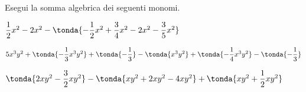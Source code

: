 % 

\begin{esercizio}
\label{ese:9.32}
Esegui la somma algebrica dei seguenti monomi.

\begin{enumeratea}
\spazielenx
\item 
\(\dfrac{1}{2}x^{2}-2x^{2}-\tonda{-{\dfrac{1}{2}}x^{2}+
\dfrac{3}{4}x^{2}-2x^{2}-\dfrac{3}{5}x^{2}}\)
\item 
\(5x^{3}y^{2}+\tonda{-{\dfrac{1}{3}}x^{3}y^{2}}+
\tonda{-{\dfrac{1}{3}}}-\tonda{x^{3}y^{2}}+
\tonda{-{\dfrac{1}{4}}x^{3}y^{2}}-\tonda{-{\dfrac{1}{3}}}\)
\item 
\(\tonda{2xy^{2}-\dfrac{3}{2}xy^{2}}-\tonda{xy^{2}+2xy^{2}-4xy^{2}
}+\tonda{xy^{2}+\dfrac{1}{2}xy^{2}}\)
\end{enumeratea}
\end{esercizio}

\subsubsection*{}

